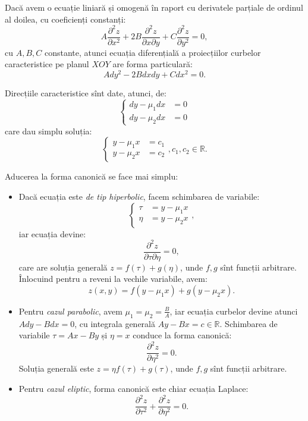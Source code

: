 \documentclass[11pt,a4paper]{article}
\newcommand\RR{\mathbb{R}}
\theoremstyle{dotless}
\theoremstyle{dotlessdr}
\begin{document}
Dacă avem o ecuație liniară și omogenă în raport cu derivatele parțiale de ordinul
al doilea, cu coeficienți constanți:
\[
  A \frac{\partial^2 z}{\partial x^2} + 2B \frac{\partial^2 z}{\partial x \partial y} + %
  C \frac{\partial^2 z}{\partial y^2} = 0,
\]
cu $ A, B, C $ constante, atunci ecuația diferențială a proiecțiilor curbelor
caracteristice pe planul $ XOY $ are forma particulară:
\[
  A dy^2 - 2B dxdy + C dx^2 = 0.
\]

Direcțiile caracteristice sînt date, atunci, de:
\[
  \begin{cases}
    dy - \mu_1 dx &= 0 \\
    dy - \mu_2 dx &= 0
  \end{cases}
\]
care dau simplu soluția:
\[
  \begin{cases}
    y - \mu_1 x &= c_1 \\
    y - \mu_2 x &= c_2
  \end{cases}, c_1, c_2 \in \RR.
\]

Aducerea la forma canonică se face mai simplu:
\begin{itemize}
\item Dacă ecuația este \emph{de tip hiperbolic}, facem schimbarea de variabile:
  \[
    \begin{cases}
      \tau &= y - \mu_1 x \\
      \eta &= y - \mu_2 x
    \end{cases},
  \]
  iar ecuația devine:
  \[
    \frac{\partial^2 z}{\partial \tau \partial \eta} = 0,
  \]
  care are soluția generală $ z = f(\tau) + g(\eta) $, unde $ f, g $ sînt funcții arbitrare.
  Înlocuind pentru a reveni la vechile variabile, avem:
  \[
    z(x, y) = f(y - \mu_1 x) + g(y - \mu_2 x).
  \]
\item Pentru \emph{cazul parabolic}, avem $ \mu_1 = \mu_2 = \frac{B}{A} $, iar ecuația
  curbelor devine atunci $ A dy - B dx = 0 $, cu integrala generală $ Ay - Bx = c \in \RR $.
  Schimbarea de variabile $ \tau = Ax - By$ și $ \eta = x $ conduce la forma canonică:
  \[
    \frac{\partial^2 z}{\partial \eta^2} = 0.
  \]
  Soluția generală este $ z = \eta f(\tau) + g(\tau) $, unde $ f, g $ sînt funcții arbitrare.
\item Pentru \emph{cazul eliptic}, forma canonică este chiar ecuația Laplace:
  \[
    \frac{\partial^2 z}{\partial \tau^2} + \frac{\partial^2 z}{\partial \eta^2} = 0.
  \]
\end{itemize}

\end{document}

